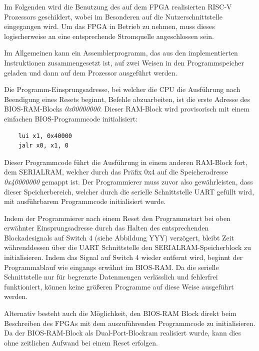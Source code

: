 
Im Folgenden wird die Benutzung des auf dem FPGA realisierten RISC-V Prozessors geschildert, wobei im Besonderen auf die Nutzerschnittstelle eingegangen wird. Um das FPGA in Betrieb zu nehmen, muss dieses logischerweise an eine entsprechende Stromquelle angeschlossen sein.


Im Allgemeinen kann ein Assemblerprogramm, das aus den implementierten Instruktionen zusammengesetzt ist, auf zwei Weisen in den Programmspeicher geladen und dann auf dem Prozessor ausgef\"uhrt werden.


Die Programm-Einsprungsadresse, bei welcher die CPU die Ausf\"uhrung nach Beendigung eines Resets beginnt, Befehle abzuarbeiten, ist die erste Adresse des BIOS-RAM-Blocks \textit{0x00000000}. Dieser RAM-Block wird provisorisch mit einem einfachen BIOS-Programmcode initialisiert:


\begin{lstlisting}
	lui x1, 0x40000
	jalr x0, x1, 0
\end{lstlisting}

Dieser Programmcode f\"uhrt  die Ausf\"uhrung in einem anderen RAM-Block fort, dem SERIALRAM, welcher durch das Pr\"afix 0x4 auf die Speicheradresse \textit{0x40000000} gemappt ist. Der Programmierer muss zuvor also gew\"ahrleisten, dass dieser Speicherbereich, welcher durch die serielle Schnittstelle UART gef\"ullt wird, mit ausf\"uhrbarem Programmcode initialisiert wurde.

Indem der Programmierer nach einem Reset den Programmstart bei oben erw\"ahnter Einsprungsadresse durch das Halten des entsprechenden Blockadesignals auf Switch 4 (siehe Abbildung YYY) verz\"ogert, bleibt Zeit w\"ahrenddessen \"uber die UART Schnittstelle den SERIALRAM-Speicherblock zu initialisieren. Indem das Signal auf Switch 4 wieder entfernt wird, beginnt der Programmablauf wie eingangs erw\"ahnt im BIOS-RAM.
Da die serielle Schnittstelle nur f\"ur begrenzte Datenmengen verl\"asslich und fehlerfrei funktioniert, k\"onnen keine gr\"oßeren Programme auf diese Weise ausgef\"uhrt werden.


Alternativ besteht auch die M\"oglichkeit, den BIOS-RAM Block direkt beim Beschreiben des FPGAs mit dem auszuf\"uhrenden Programmcode zu initialisieren. Da der BIOS-RAM-Block als Dual-Port-Blockram realisiert wurde, kann dies ohne zeitlichen Aufwand bei einem Reset erfolgen.

